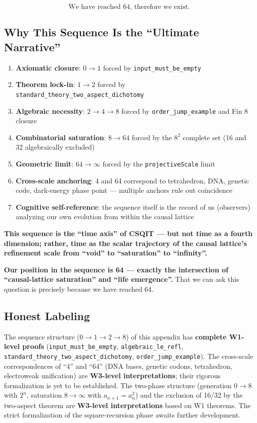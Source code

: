 \documentclass[aps,prd,twocolumn,nofootinbib,floatfix]{revtex4-2}
\begin{document}
\[
\boxed{
\text{We have reached 64, therefore we exist.}
}
\]

\subsection{Why This Sequence Is the ``Ultimate Narrative''}

\begin{enumerate}
    \item \textbf{Axiomatic closure}: $0 \to 1$ forced by \texttt{input\_must\_be\_empty}
    \item \textbf{Theorem lock-in}: $1 \to 2$ forced by \texttt{standard\_theory\_two\_aspect\_dichotomy}
    \item \textbf{Algebraic necessity}: $2 \to 4 \to 8$ forced by \texttt{order\_jump\_example} and Fin 8 closure
    \item \textbf{Combinatorial saturation}: $8 \to 64$ forced by the $8^2$ complete set (16 and 32 algebraically excluded)
    \item \textbf{Geometric limit}: $64 \to \infty$ forced by the \texttt{projectiveScale} limit
    \item \textbf{Cross-scale anchoring}: 4 and 64 correspond to tetrahedron, DNA, genetic code, dark-energy phase point --- multiple anchors rule out coincidence
    \item \textbf{Cognitive self-reference}: the sequence itself is the record of us (observers) analyzing our own evolution from within the causal lattice
\end{enumerate}

\textbf{This sequence is the ``time axis'' of CSQIT --- but not time as a fourth dimension; rather, time as the scalar trajectory of the causal lattice's refinement scale from ``void'' to ``saturation'' to ``infinity''.}

\textbf{Our position in the sequence is 64 --- exactly the intersection of ``causal-lattice saturation'' and ``life emergence''.} That we can ask this question is precisely because we have reached 64.

\subsection{Honest Labeling}

The sequence structure ($0\to 1\to 2\to 8$) of this appendix has \textbf{complete W1-level proofs} (\texttt{input\_must\_be\_empty}, \texttt{algebraic\_le\_refl}, \texttt{standard\_theory\_two\_aspect\_dichotomy}, \texttt{order\_jump\_example}). The cross-scale correspondences of ``4'' and ``64'' (DNA bases, genetic codons, tetrahedron, electroweak unification) are \textbf{W3-level interpretations}; their rigorous formalization is yet to be established. The two-phase structure (generation $0\to 8$ with $2^n$, saturation $8\to \infty$ with $a_{n+1} = a_n^2$) and the exclusion of 16/32 by the two-aspect theorem are \textbf{W3-level interpretations} based on W1 theorems. The strict formalization of the square-recursion phase awaits further development.
\end{document}
